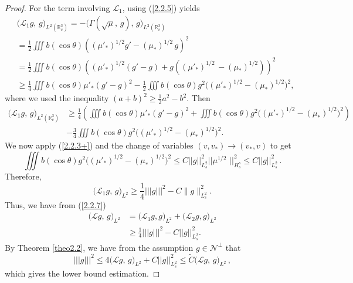 \documentclass{amsart}[12pt, article]
\begin{document}
\begin{proof}
For the term involving ${{\mathcal L}}_1$, using (\ref{2.2.5}) yields
\begin{align*}
&\Big({{\mathcal L}}_1 g,\, g\Big)_{L^2({{{\mathbb R}}}^3_v)}= -\Big(\Gamma(\sqrt{\mu},\,
g),\, g\Big)_{L^2({{{\mathbb R}}}^3_v)} \\
&= \frac 1 2 \iiint b(\cos\theta) \left(
(\mu'_*)^{1/2} g' - (\mu_*)^{1/2}\, g \right)^2\\
&= \frac 12 \iiint b(\cos\theta)  \left( (\mu'_*)^{1/2} (g' -g)+
g((\mu'_*)^{1/2}\,-(\mu_*)^{1/2})\right)^2\\
&\geq \frac 1 4 \iiint b(\cos\theta) \mu '_\ast (g'-g)^2 - \frac 12
\iiint b(\cos\theta) g^2 \Big((\mu'_*)^{1/2} -(\mu_*)^{1/2} \Big)^2,
\end{align*}
where we used the inequality $(a+b)^2 \geq {\frac 1 2} a^2 -b^2$. Then
\begin{align*}
\Big({{\mathcal L}}_1 g,\, g\Big)_{L^2({{{\mathbb R}}}^3_v)}&\geq \frac 1 4 \left(\iiint
b(\cos\theta) \mu '_\ast (g'-g)^2 + \iiint b(\cos\theta) g^2
\Big((\mu'_*)^{1/2} -(\mu_*)^{1/2} \Big)^2\right)\\
&- \frac 34 \iiint b(\cos\theta) g^2 \Big((\mu'_*)^{1/2}
-(\mu_*)^{1/2} \Big)^2.
\end{align*}
We now apply (\ref{2.2.3+})  and
the change of variables $(v,v_\ast )\rightarrow (v_*,v)$ to get
$$\iiint b(\cos\theta) g^2 \Big((\mu'_*)^{1/2}
-(\mu_*)^{1/2} \Big)^2 \leq C || g||^2_{L^2_s} ||
\mu^{1/2}\,\,||^2_{H^s_s}\leq C || g||^2_{L^2_s}\,.
$$
Therefore,
\begin{equation*}\label{2.2.10}
\Big({{\mathcal L}}_1 g,\, g\Big)_{L^2} \geq \frac 1 4 ||| g|||^2 - C \|
g\|^2_{L^2_s}.
\end{equation*}
Thus, we have {}from (\ref{2.2.7})
\begin{align*}
\Big({{\mathcal L}} g,\, g\Big)_{L^2} &= \Big({{\mathcal L}}_1  g,  g\Big)_{L^2} + \Big({{\mathcal L}}_2
 g,  g\Big)_{L^2}\\
&\geq \frac 14 ||| g|||^2  -C ||  g||^2_{L^2_s}.
\end{align*}
By Theorem \ref{theo2.2}, we have {}from
the assumption  $g\in \mathcal{N}^{\perp}$ that
$$
|||  g |||^2 \leq 4\Big({{\mathcal L}} g,\, g\Big)_{L^2} + C ||
g||^2_{L^2_s} \leq \tilde C \Big({{\mathcal L}} g,\, g\Big)_{L^2}\,,
$$
which gives the lower bound estimation.


\end{proof}
\end{document}

